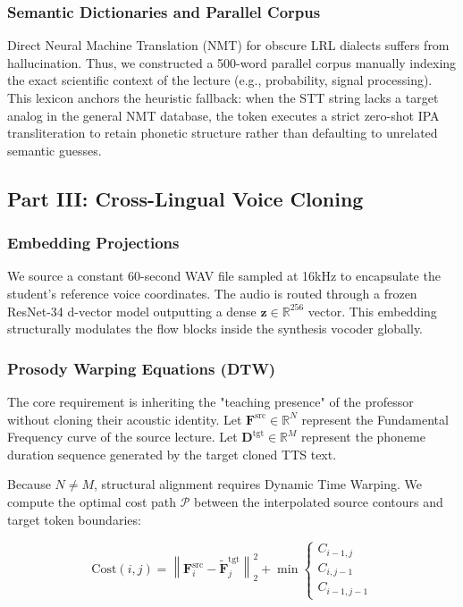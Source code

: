 \documentclass[10pt,conference]{IEEEtran}
\begin{document}
\subsubsection{Semantic Dictionaries and Parallel Corpus}
Direct Neural Machine Translation (NMT) for obscure LRL dialects suffers from hallucination. Thus, we constructed a 500-word parallel corpus manually indexing the exact scientific context of the lecture (e.g., probability, signal processing). This lexicon anchors the heuristic fallback: when the STT string lacks a target analog in the general NMT database, the token executes a strict zero-shot IPA transliteration to retain phonetic structure rather than defaulting to unrelated semantic guesses.


\subsection{Part III: Cross-Lingual Voice Cloning}

\subsubsection{Embedding Projections}
We source a constant 60-second WAV file sampled at 16kHz to encapsulate the student's reference voice coordinates. The audio is routed through a frozen ResNet-34 d-vector model outputting a dense $\mathbf{z} \in \mathbb{R}^{256}$ vector. This embedding structurally modulates the flow blocks inside the synthesis vocoder globally.

\subsubsection{Prosody Warping Equations (DTW)}
The core requirement is inheriting the "teaching presence" of the professor without cloning their acoustic identity. Let $\mathbf{F}^{\text{src}} \in \mathbb{R}^{N}$ represent the Fundamental Frequency curve of the source lecture. Let $\mathbf{D}^{\text{tgt}} \in \mathbb{R}^{M}$ represent the phoneme duration sequence generated by the target cloned TTS text. 

Because $N \neq M$, structural alignment requires Dynamic Time Warping. We compute the optimal cost path $\mathcal{P}$ between the interpolated source contours and target token boundaries:

\begin{equation}
\text{Cost}(i, j) = \left\| \mathbf{F}^{\text{src}}_i - \tilde{\mathbf{F}}^{\text{tgt}}_j \right\|_{2}^{2} + \min \begin{cases} C_{i-1, j} \\ C_{i, j-1} \\ C_{i-1, j-1} \end{cases}
\end{equation}
\end{document}

